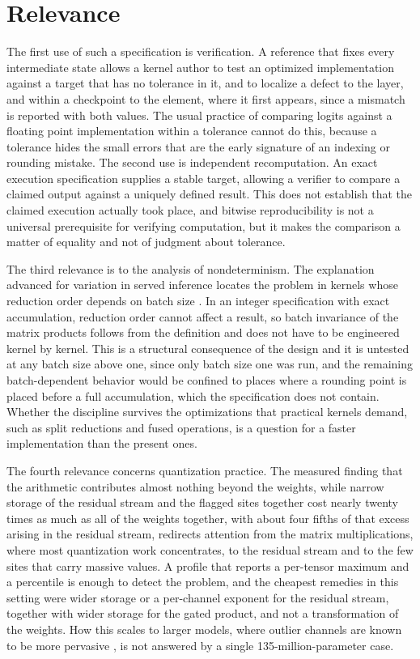 \documentclass[11pt]{article}
\begin{document}
\section{Relevance}

The first use of such a specification is verification. A reference that fixes every intermediate state allows a kernel author to test an optimized implementation against a target that has no tolerance in it, and to localize a defect to the layer, and within a checkpoint to the element, where it first appears, since a mismatch is reported with both values. The usual practice of comparing logits against a floating point implementation within a tolerance cannot do this, because a tolerance hides the small errors that are the early signature of an indexing or rounding mistake. The second use is independent recomputation. An exact execution specification supplies a stable target, allowing a verifier to compare a claimed output against a uniquely defined result. This does not establish that the claimed execution actually took place, and bitwise reproducibility is not a universal prerequisite for verifying computation, but it makes the comparison a matter of equality and not of judgment about tolerance.

The third relevance is to the analysis of nondeterminism. The explanation advanced for variation in served inference locates the problem in kernels whose reduction order depends on batch size \cite{he2025}. In an integer specification with exact accumulation, reduction order cannot affect a result, so batch invariance of the matrix products follows from the definition and does not have to be engineered kernel by kernel. This is a structural consequence of the design and it is untested at any batch size above one, since only batch size one was run, and the remaining batch-dependent behavior would be confined to places where a rounding point is placed before a full accumulation, which the specification does not contain. Whether the discipline survives the optimizations that practical kernels demand, such as split reductions and fused operations, is a question for a faster implementation than the present ones.

The fourth relevance concerns quantization practice. The measured finding that the arithmetic contributes almost nothing beyond the weights, while narrow storage of the residual stream and the flagged sites together cost nearly twenty times as much as all of the weights together, with about four fifths of that excess arising in the residual stream, redirects attention from the matrix multiplications, where most quantization work concentrates, to the residual stream and to the few sites that carry massive values. A profile that reports a per-tensor maximum and a percentile is enough to detect the problem, and the cheapest remedies in this setting were wider storage or a per-channel exponent for the residual stream, together with wider storage for the gated product, and not a transformation of the weights. How this scales to larger models, where outlier channels are known to be more pervasive \cite{dettmers2022}, is not answered by a single 135-million-parameter case.
\end{document}
